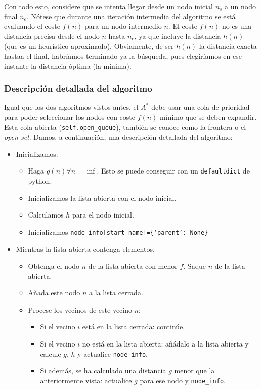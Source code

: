 \documentclass{article}
\begin{document}
Con todo esto, considere que se intenta llegar desde un nodo inicial $n_s$ a un nodo final $n_e$. Nótese que durante una iteración intermedia del algoritmo se está evaluando el coste $f(n)$ para un nodo intermedio $n$. El coste $f(n)$ no es una distancia precisa desde el nodo $n$ hasta $n_e$, ya que incluye la distancia $h(n)$ (que es un heurístico aproximado). Obviamente, de ser $h(n)$ la distancia exacta hastaa el final, habríamos terminado ya la búsqueda, pues elegiríamos en ese instante la distancia óptima (la mínima).

\subsubsection{Descripción detallada del algoritmo}
Igual que los dos algoritmos vistos antes, el $A^*$ debe usar una cola de prioridad para poder seleccionar los nodos con coste $f(n)$ mínimo que se deben expandir. Esta cola abierta (\texttt{self.open\_queue}), también se conoce como la frontera o el \textit{open set}. Damos, a continuación, una descripción detallada del algoritmo:

\begin{itemize}
    \item Inicializamos:
    \begin{itemize}
        \item Haga $g(n) \forall n = \inf$. Esto se puede conseguir con un \texttt{defaultdict} de python. 
        \item Inicializamos la lista abierta con el nodo inicial.
        \item Calculamos $h$ para el nodo inicial.
        \item Inicializamos \texttt{node\_info[start\_name]=\{'parent': None\}}
    \end{itemize}
    \item Mientras la lista abierta contenga elementos.
        \begin{itemize}
            \item Obtenga el nodo $n$ de la lista abierta con menor $f$. Saque $n$ de la lista abierta.
            \item Añada este nodo $n$ a la lista cerrada.
            \item Procese los vecinos de este vecino $n$: 
            \begin{itemize}
                \item Si el vecino $i$ está en la lista cerrada: continúe.
                \item Si el vecino $i$ no está en la lista abierta: añádalo a la lista abierta y calcule $g$, $h$ y actualice \texttt{node\_info}.
                \item Si además, se ha calculado una distancia $g$ menor que la anteriormente vista: actualice $g$ para ese nodo y \texttt{node\_info}.
            \end{itemize}
        \end{itemize}
    \end{itemize}
\end{document}
